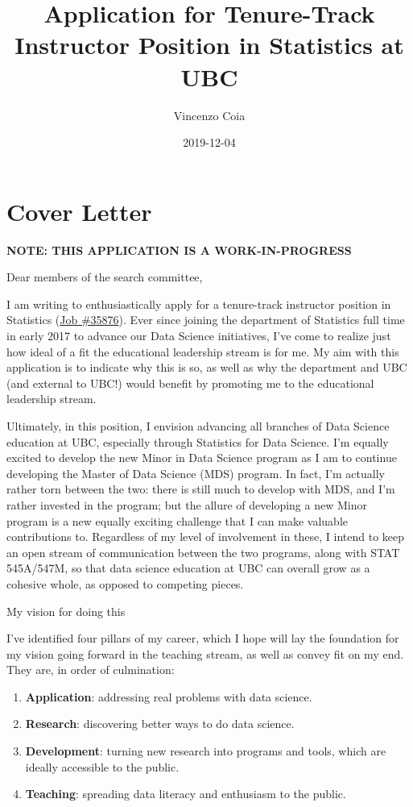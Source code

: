 \documentclass[]{book}
\title{Application for Tenure-Track Instructor Position in Statistics at UBC}
\author{Vincenzo Coia}
\date{2019-12-04}
\begin{document}
\maketitle

{
\setcounter{tocdepth}{1}
\tableofcontents
}
\hypertarget{cover-letter}{%
\chapter{Cover Letter}\label{cover-letter}}

\textbf{NOTE: THIS APPLICATION IS A WORK-IN-PROGRESS}

Dear members of the search committee,

I am writing to enthusiastically apply for a tenure-track instructor position in Statistics (\href{https://www.stat.ubc.ca/three-tenure-track-instructor-positions-statistics-35876}{Job \#35876}). Ever since joining the department of Statistics full time in early 2017 to advance our Data Science initiatives, I've come to realize just how ideal of a fit the educational leadership stream is for me. My aim with this application is to indicate why this is so, as well as why the department and UBC (and external to UBC!) would benefit by promoting me to the educational leadership stream.

Ultimately, in this position, I envision advancing all branches of Data Science education at UBC, especially through Statistics for Data Science. I'm equally excited to develop the new Minor in Data Science program as I am to continue developing the Master of Data Science (MDS) program. In fact, I'm actually rather torn between the two: there is still much to develop with MDS, and I'm rather invested in the program; but the allure of developing a new Minor program is a new equally exciting challenge that I can make valuable contributions to. Regardless of my level of involvement in these, I intend to keep an open stream of communication between the two programs, along with STAT 545A/547M, so that data science education at UBC can overall grow as a cohesive whole, as opposed to competing pieces.

My vision for doing this

I've identified four pillars of my career, which I hope will lay the foundation for my vision going forward in the teaching stream, as well as convey fit on my end. They are, in order of culmination:

\begin{enumerate}
\def\labelenumi{\arabic{enumi}.}
\item
  \textbf{Application}: addressing real problems with data science.
\item
  \textbf{Research}: discovering better ways to do data science.
\item
  \textbf{Development}: turning new research into programs and tools, which are ideally accessible to the public.
\item
  \textbf{Teaching}: spreading data literacy and enthusiasm to the public.
\end{enumerate}
\end{document}
